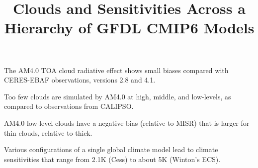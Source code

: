 \documentclass[draft]{agujournal2019}
\begin{document}
\title{Clouds and Sensitivities Across a Hierarchy of GFDL CMIP6 Models}


\begin{keypoints}
  \item{The AM4.0 TOA cloud radiative effect shows small biases compared with CERES-EBAF observations, versions 
  2.8 and 4.1.}
  \item{Too few clouds are simulated by AM4.0 at high, middle, and low-levels, as compared to observations from CALIPSO.}
  \item{AM4.0 low-level clouds have a negative bias (relative to MISR) that is larger for thin clouds, relative to thick.}
  \item{Various configurations of a single global climate model lead to climate sensitivities that range from 2.1K (Cess) to 
  about 5K (Winton's ECS).}
\end{keypoints}
\end{document}
